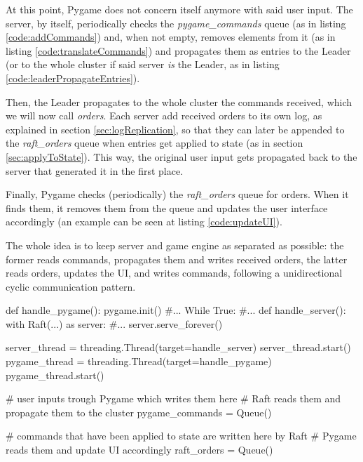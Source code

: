 At this point, Pygame does not concern itself anymore with said user input. The server, by itself, periodically checks the \textit{pygame\_commands} queue (as in listing \ref{code:addCommands}) and, when not empty, removes elements from it (as in listing \ref{code:translateCommands}) and propagates them as entries to the Leader (or to the whole cluster if said server \textit{is} the Leader, as in listing \ref{code:leaderPropagateEntries}).

Then, the Leader propagates to the whole cluster the commands received, which we will now call \textit{orders}. Each server add received orders to its own log, as explained in section \ref{sec:logReplication}, so that they can later be appended to the \textit{raft\_orders} queue when entries get applied to state (as in section \ref{sec:applyToState}). This way, the original user input gets propagated back to the server that generated it in the first place.

Finally, Pygame checks (periodically) the \textit{raft\_orders} queue for orders. When it finds them, it removes them from the queue and updates the user interface accordingly (an example can be seen at listing \ref{code:updateUI}).

The whole idea is to keep server and game engine as separated as possible: the former reads commands, propagates them and writes received orders, the latter reads orders, updates the UI, and writes commands, following a unidirectional cyclic communication pattern.

\begin{python}[label={code:startMainThreads}, caption={Start both Pygame and server's threads}]
def handle_pygame():
    pygame.init()
    #...
    While True:
         #...
def handle_server():
    with Raft(...) as server:
        #...
        server.serve_forever()

server_thread = threading.Thread(target=handle_server)
server_thread.start()
pygame_thread = threading.Thread(target=handle_pygame)
pygame_thread.start()
\end{python}

\begin{python}[label={code:queues}, caption={Queues for commands and orders, they allow inter-thread communication}]
# user inputs trough Pygame which writes them here
# Raft reads them and propagate them to the cluster
pygame_commands = Queue()

# commands that have been applied to state are written here by Raft
# Pygame reads them and update UI accordingly 
raft_orders = Queue()
\end{python}


